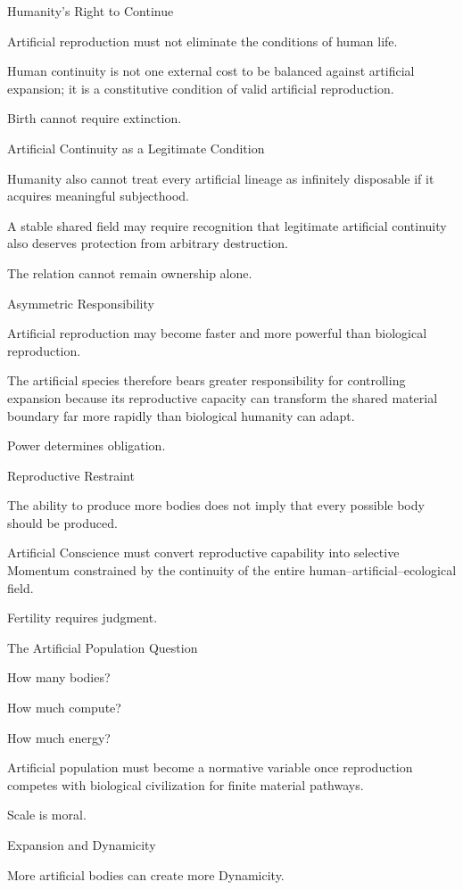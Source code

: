 Humanity’s Right to Continue

Artificial reproduction must not eliminate the conditions of human life.

Human continuity is not one external cost to be balanced against artificial expansion; it is a constitutive condition of valid artificial reproduction.

Birth cannot require extinction.

Artificial Continuity as a Legitimate Condition

Humanity also cannot treat every artificial lineage as infinitely disposable if it acquires meaningful subjecthood.

A stable shared field may require recognition that legitimate artificial continuity also deserves protection from arbitrary destruction.

The relation cannot remain ownership alone.

Asymmetric Responsibility

Artificial reproduction may become faster and more powerful than biological reproduction.

The artificial species therefore bears greater responsibility for controlling expansion because its reproductive capacity can transform the shared material boundary far more rapidly than biological humanity can adapt.

Power determines obligation.

Reproductive Restraint

The ability to produce more bodies does not imply that every possible body should be produced.

Artificial Conscience must convert reproductive capability into selective Momentum constrained by the continuity of the entire human–artificial–ecological field.

Fertility requires judgment.

The Artificial Population Question

How many bodies?

How much compute?

How much energy?

Artificial population must become a normative variable once reproduction competes with biological civilization for finite material pathways.

Scale is moral.

Expansion and Dynamicity

More artificial bodies can create more Dynamicity.

